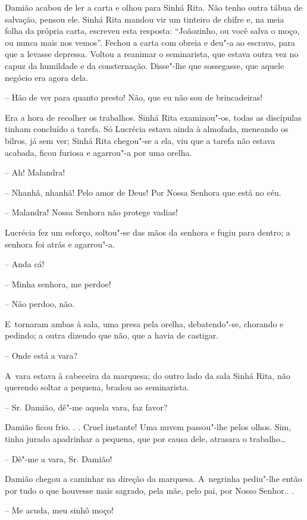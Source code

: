 Damião acabou de ler a carta e olhou para Sinhá Rita. Não tenho outra
tábua de salvação, pensou ele. Sinhá Rita mandou vir um tinteiro de
chifre e, na meia folha da própria carta, escreveu esta resposta:
``Joãozinho, ou você salva o moço, ou nunca mais nos vemos''. Fechou a
carta com obreia e deu"-a ao escravo, para que a levasse depressa. Voltou
a reanimar o seminarista, que estava outra vez no capuz da humildade e
da consternação. Disse"-lhe que sossegasse, que aquele negócio era agora
dela.

-- Hão de ver para quanto presto! Não, que eu não sou de brincadeiras!

Era a hora de recolher os trabalhos. Sinhá Rita examinou"-os, todas as
discípulas tinham concluído a tarefa. Só Lucrécia estava ainda à
almofada, meneando os bilros, já sem ver; Sinhá Rita chegou"-se a ela,
viu que a tarefa não estava acabada, ficou furiosa e agarrou"-a por uma
orelha.

-- Ah! Malandra!

-- Nhanhã, nhanhã! Pelo amor de Deus! Por Nossa Senhora que está no céu.

-- Malandra! Nossa Senhora não protege vadias!

Lucrécia fez um esforço, soltou"-se das mãos da senhora e fugiu para
dentro; a senhora foi atrás e agarrou"-a.

-- Anda cá!

-- Minha senhora, me perdoe!

-- Não perdoo, não.

E~tornaram ambas à sala, uma presa pela orelha, debatendo"-se, chorando e
pedindo; a outra dizendo que não, que a havia de castigar.

-- Onde está a vara?

A~vara estava à cabeceira da marquesa; do outro lado da sala Sinhá Rita,
não querendo soltar a pequena, bradou ao seminarista.

-- Sr. Damião, dê"-me aquela vara, faz favor?

Damião ficou frio. . . Cruel instante! Uma nuvem passou"-lhe pelos olhos.
Sim, tinha jurado apadrinhar a pequena, que por causa dele, atrasara o
trabalho\ldots{}

-- Dê"-me a vara, Sr. Damião!

Damião chegou a caminhar na direção da marquesa. A~negrinha pediu"-lhe
então por tudo o que houvesse mais sagrado, pela mãe, pelo pai, por
Nosso Senhor.. .

-- Me acuda, meu sinhô moço!

